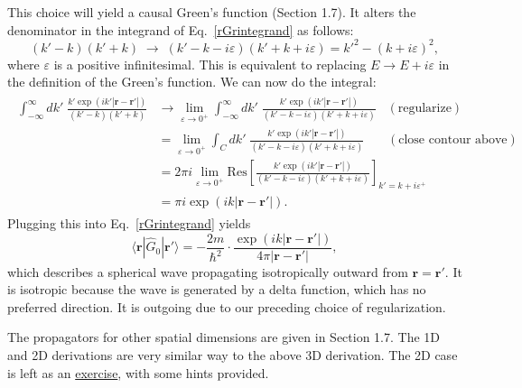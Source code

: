 \documentclass[pra,12pt]{revtex4}
\begin{document}
\noindent
This choice will yield a causal Green's function (Section 1.7).  It
alters the denominator in the integrand of Eq.~\eqref{rGrintegrand} as
follows:
\begin{equation}
  (k' - k)(k'+k) \;\rightarrow\; (k' - k - i\varepsilon)(k'+k+i\varepsilon) = {k'}^2 - (k+i\varepsilon)^2,
\end{equation}
where $\varepsilon$ is a positive infinitesimal.  This is equivalent
to replacing $E \rightarrow E + i\varepsilon$ in the definition of the
Green's function.  We can now do the integral:
\begin{align*}
  \begin{aligned}\int_{-\infty}^\infty dk' \; \frac{\displaystyle k' \exp\left(ik'|\mathbf{r}-\mathbf{r}'|\right)}{(k' - k)(k'+k)} &\rightarrow \lim_{\varepsilon \rightarrow 0^+} \int_{-\infty}^\infty dk' \; \frac{\displaystyle k' \exp\left(ik'|\mathbf{r}-\mathbf{r}'|\right)}{(k' - k - i\varepsilon)(k'+k+i\varepsilon)}\;\;\; (\text{regularize}) \\ &= \lim_{\varepsilon \rightarrow 0^+} \int_C dk' \; \frac{\displaystyle k' \exp\left(ik'|\mathbf{r}-\mathbf{r}'|\right)}{(k' - k - i\varepsilon)(k'+k+i\varepsilon)} \quad\;\;\; (\text{close contour above}) \\ &= 2\pi i \lim_{\varepsilon \rightarrow 0^+} \mathrm{Res}\left[\frac{\displaystyle k' \exp\left(ik'|\mathbf{r}-\mathbf{r}'|\right)}{(k' - k - i\varepsilon)(k'+k+i\varepsilon)}\right]_{k'=k+i\varepsilon^+} \\ &= \pi i \exp\left(ik|\mathbf{r}-\mathbf{r}'|\right).\end{aligned}
\end{align*}
Plugging this into Eq.~\eqref{rGrintegrand} yields
\begin{equation}
  \langle\mathbf{r}|\hat{G}_0|\mathbf{r}'\rangle = -\frac{2m}{\hbar^2}
  \cdot \frac{\exp\left(ik|\mathbf{r}-\mathbf{r}'|\right)}{4\pi|\mathbf{r}-\mathbf{r}'|},
\end{equation}
which describes a spherical wave propagating isotropically outward
from $\mathbf{r} = \mathbf{r}'$.  It is isotropic because the wave is
generated by a delta function, which has no preferred direction.  It
is outgoing due to our preceding choice of regularization.

The propagators for other spatial dimensions are given in Section 1.7.
The 1D and 2D derivations are very similar way to the above 3D
derivation.  The 2D case is left as an
\hyperref[ex:2dpropagator]{exercise}, with some hints provided.
\end{document}
